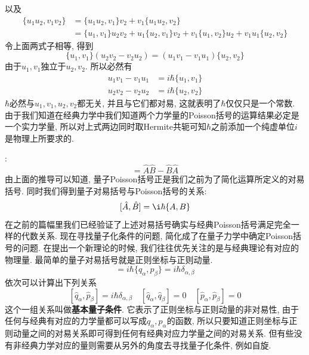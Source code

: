 \documentclass[a4paper,11pt]{book}
\newcommand{\A}{\hat{A}}
\newcommand{\B}{\hat{B}}
\begin{document}
以及
\begin{equation*}
  \begin{split}
     \{u_1u_2,v_1v_2\} & =\{u_1u_2,v_1\}v_2+v_1\{u_1u_2,v_2\} \\
       & =\{u_1,v_1\}u_2v_2+u_1\{u_2,v_1\}v_2+v_1\{u_1,v_2\}u_2+v_1u_1\{u_2,v_2\}
  \end{split}
\end{equation*}
令上面两式子相等, 得到
\begin{equation*}
  \{u_1,v_1\}(u_2v_2-v_2u_2)=(u_1v_1-v_1u_1)\{u_2,v_2\}
\end{equation*}
由于$u_1,v_1$独立于$u_2,v_2$. 所以必然有
\begin{equation*}
  \begin{split}
     u_1v_1-v_1u_1&=i\hbar\{u_1,v_1\}\\
     u_2v_2-v_2u_2&=i\hbar\{u_2,v_2\}
  \end{split}
\end{equation*}
$\hbar$必然与$u_1,v_1,u_2,v_2$都无关, 并且与它们都对易, 这就表明了$\hbar$仅仅只是一个常数. 由于我们知道在经典力学中我们知道两个力学量的Poisson括号的运算结果必定是一个实力学量, 所以对上式两边同时取Hermite共轭可知$\hbar$之前添加一个纯虚单位$i$是物理上所要求的.

:
\begin{equation*}
  [\A,\B]=\A\B-\B\A
\end{equation*}
由上面的推导可以知道, 量子Poisson括号正是我们之前为了简化运算所定义的对易括号. 同时我们得到量子对易括号与Poisson括号的关系:
\begin{equation}\label{qpoisson to cpoisson}
  [\A,\B]=\i\hbar\{A,B\}
\end{equation}
在之前的篇幅里我们已经验证了上述对易括号确实与经典Poisson括号满足完全一样的代数关系. 现在寻找量子化条件的问题, 简化成了在量子力学中确定Poisson括号的问题. 在提出一个新理论的时候, 我们往往优先关注的是与经典理论有对应的物理量. 最简单的量子对易括号就是正则坐标与正则动量.
\begin{equation*}
  [\hat{q}_\alpha,\hat{p}_\beta]=i\hbar\{q_\alpha,p_\beta\}=i\hbar\delta_{\alpha,\beta}
\end{equation*}
依次可以计算出下列关系
\begin{equation}\label{basic quantization}
  [\hat{q}_\alpha,\hat{p}_\beta]=i\hbar\delta_{\alpha,\beta}\quad[\hat{q}_\alpha,\hat{q}_\beta]=0\quad[\hat{p}_\alpha,\hat{p}_\beta]=0
\end{equation}
这个一组关系叫做\textbf{基本量子条件}. 它表示了正则坐标与正则动量的非对易性, 由于任何与经典有对应的力学量都可以写成$q_\alpha,p_\alpha$的函数, 所以只要知道正则坐标与正则动量之间的对易关系即可得到任何有经典对应力学量之间的对易关系. 但有些没有非经典力学对应的量则需要从另外的角度去寻找量子化条件, 例如自旋.
\end{document}
